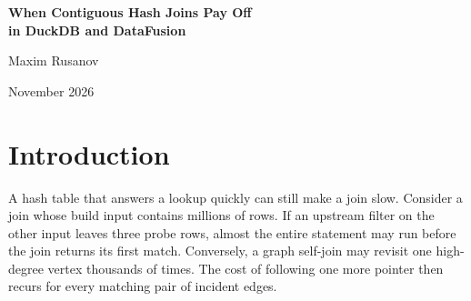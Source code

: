 \documentclass[11pt,a4paper]{article}
\begin{document}
\begin{center}
{\LARGE\bfseries When Contiguous Hash Joins Pay Off\\[3pt] in DuckDB and DataFusion\par}
\vspace{8pt}
{\large Maxim Rusanov\par}
\vspace{3pt}
{\small November 2026\par}
\end{center}

\begin{abstract}
A hash join can replace a sequence of dependent loads with a sequential scan by placing the
candidates for each probe key next to one another. The build side pays for that arrangement before
the operator knows how often each range will be visited. This study follows that exchange through
two independent integrations of the Unchained design. DuckDB 1.5.6 scatters staged rows into
contiguous buckets. Apache DataFusion 55.2.0 can instead build a contiguous index of Arrow row
identifiers. In paired single-thread SQL runs, DuckDB gained a factor of 1.068 on graph queries by
geometric mean and lost ground on all three analytical suites. One JOB join scattered 5.54 million
rows for three probes. On the same DataFusion build, automatic CSR selection at 200,000 rows
reduced summed median times versus native by 73\% on 35 SNAP queries and 11.7\% on 100 JOB
queries. Lowering the threshold more than halved aggregate time on twelve held-out graph
queries, including Parquet reads, and had little aggregate effect on analytical queries whose
index changed. A cost decomposition relates
these outcomes to probe frequency, candidate volume and the bytes moved during construction. It
explains why the existing native index and the keys reached by the probe matter as much as build
cardinality when selecting a layout.
\end{abstract}

\section{Introduction}
A hash table that answers a lookup quickly can still make a join slow. Consider a join whose build
input contains millions of rows. If an upstream filter on the other input leaves three probe rows,
almost the entire statement may run before the join returns its first match. Conversely, a graph
self-join may revisit one high-degree vertex thousands of times. The cost of following one more
pointer then recurs for every matching pair of incident edges.
\end{document}
